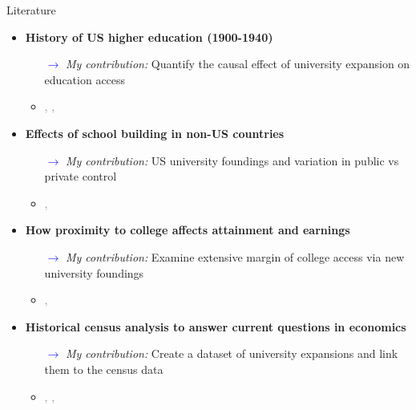 \documentclass[notes,11pt, aspectratio=169]{beamer}
\begin{document}
\begin{frame}{Literature}
  \begin{itemize}
    \item \textbf{History of US higher education (1900-1940)}
    \begin{itemize}
      \item[\textcolor{blue}{$\rightarrow$}] \textit{My contribution:} Quantify the causal effect of university expansion on education access
      \item \textcolor{gray}{\cite{goldinAmericasGraduationHigh1998}, \cite{goldinOriginsStateLevelDifferences1998}, \cite{goldinHumanCapitalCenturyAmerican2001}}
    \end{itemize}

    \item \textbf{Effects of school building in non-US countries}
    \begin{itemize}
      \item[\textcolor{blue}{$\rightarrow$}] \textit{My contribution:} US university foundings and variation in public vs private control
      \item \textcolor{gray}{\cite{dufloSchoolingLaborMarket2001}, \cite{nimier-davidLocalHumanCapital2023}}
    \end{itemize}

    \item \textbf{How proximity to college affects attainment and earnings}
    \begin{itemize}
      \item[\textcolor{blue}{$\rightarrow$}] \textit{My contribution:} Examine extensive margin of college access via new university foundings
      \item \textcolor{gray}{\cite{cardUsingGeographicVariation1993}, \cite{actonDistanceDegreesHow2025}}
    \end{itemize}

    \item \textbf{Historical census analysis to answer current questions in economics}
    \begin{itemize}
      \item[\textcolor{blue}{$\rightarrow$}] \textit{My contribution:} Create a dataset of university expansions and link them to the census data
      \item \textcolor{gray}{\cite{abramitzkyNationImmigrantsAssimilation2014}, \cite{derenoncourtCanYouMove2022}, \cite{bleemerChangesCollegeMobility2025}}
    \end{itemize}
  \end{itemize}
\end{frame}
\end{document}
